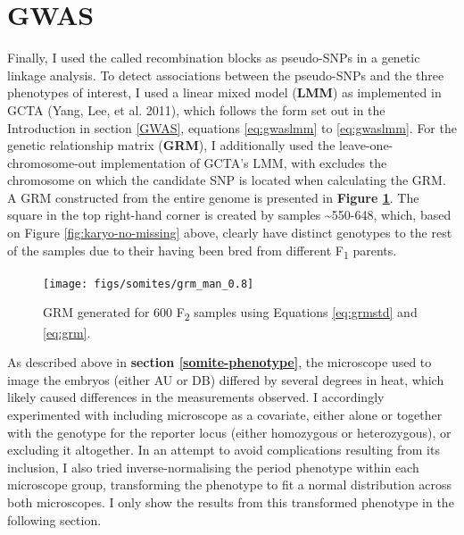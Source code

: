\documentclass[
]{book}
\begin{document}
\clearpage

\hypertarget{somite-assoc-tests}{%
\section{GWAS}\label{somite-assoc-tests}}

Finally, I used the called recombination blocks as pseudo-SNPs in a genetic linkage analysis. To detect associations between the pseudo-SNPs and the three phenotypes of interest, I used a linear mixed model (\textbf{LMM}) as implemented in GCTA (Yang, Lee, et al. 2011), which follows the form set out in the Introduction in section \ref{GWAS}, equations \eqref{eq:gwaslmm} to \eqref{eq:gwaslmm}. For the genetic relationship matrix (\textbf{GRM}), I additionally used the leave-one-chromosome-out implementation of GCTA's LMM, with excludes the chromosome on which the candidate SNP is located when calculating the GRM. A GRM constructed from the entire genome is presented in \textbf{Figure \ref{fig:somite-grm}}. The square in the top right-hand corner is created by samples \textasciitilde550-648, which, based on Figure \ref{fig:karyo-no-missing} above, clearly have distinct genotypes to the rest of the samples due to their having been bred from different F\textsubscript{1} parents.



\begin{figure}
\texttt{[image: figs/somites/grm\_man\_0.8]} \caption{GRM generated for 600 F\textsubscript{2} samples using Equations \eqref{eq:grmstd} and \eqref{eq:grm}.}\label{fig:somite-grm}
\end{figure}

As described above in \textbf{section \ref{somite-phenotype}}, the microscope used to image the embryos (either AU or DB) differed by several degrees in heat, which likely caused differences in the measurements observed. I accordingly experimented with including microscope as a covariate, either alone or together with the genotype for the reporter locus (either homozygous or heterozygous), or excluding it altogether. In an attempt to avoid complications resulting from its inclusion, I also tried inverse-normalising the period phenotype within each microscope group, transforming the phenotype to fit a normal distribution across both microscopes. I only show the results from this transformed phenotype in the following section.
\end{document}
